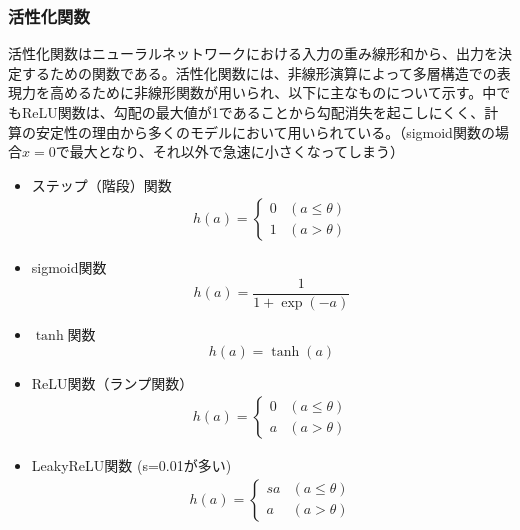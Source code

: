 \subsubsection{活性化関数}
活性化関数はニューラルネットワークにおける入力の重み線形和から、出力を決定するための関数である。活性化関数には、非線形演算によって多層構造での表現力を高めるために非線形関数が用いられ、以下に主なものについて示す。中でもReLU関数は、勾配の最大値が1であることから勾配消失を起こしにくく、計算の安定性の理由から多くのモデルにおいて用いられている。（sigmoid関数の場合$x=0$で最大となり、それ以外で急速に小さくなってしまう）
\begin{itemize}
	\item ステップ（階段）関数
		\begin{align}
			h(a) =
			\begin{cases}
			0 & (a \leq \theta)\\
			1 & (a > \theta)
			\end{cases}
		\end{align}
	\item sigmoid関数
		\begin{equation}
			h(a) = \frac{1}{1+\exp(-a)}
		\end{equation}
	\item $\tanh$関数
		\begin{equation}
			h(a) = \tanh(a)
	\end{equation}
	\item ReLU関数（ランプ関数）
		\begin{align}
			h(a) =
			\begin{cases}
			0 & (a \leq \theta)\\
			a & (a > \theta)
			\end{cases}
		\end{align}
	\item LeakyReLU関数 (s=0.01が多い)
		\begin{align}
			h(a) =
			\begin{cases}
			sa & (a \leq \theta)\\
			a & (a > \theta)
			\end{cases}
		\end{align}
\end{itemize}
